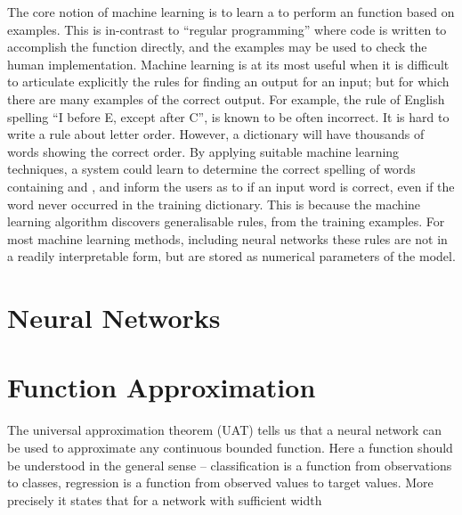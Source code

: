 \documentclass[12pt,parskip]{komatufte}
\begin{document}
The core notion of machine learning is to learn a to perform an function based on examples.
This is in-contrast to ``regular programming'' where code is written to accomplish the function directly, and the examples may be used to check the human implementation.
Machine learning is at its most useful when it is difficult to articulate explicitly the rules for finding an output for an input; but for which there are many examples of the correct output.
For example, the rule of English spelling ``I before E, except after C'', is known to be often incorrect.
It is hard to write a rule about letter order.
However, a dictionary will have thousands of words showing the correct order.
By applying suitable machine learning techniques,
a system could learn to determine the correct spelling of words containing  and ,
and inform the users as to if an input word is correct, even if the word never occurred in the training dictionary.
This is because the machine learning algorithm discovers generalisable rules,
from the training examples.
For most machine learning methods, including neural networks these rules are not in a readily interpretable form, but are stored as numerical parameters of the model.

\section{Neural Networks}



\section{Function Approximation}


The universal approximation theorem (UAT) tells us that a neural network can be used to approximate any continuous bounded function.
Here a function should be understood in the general sense -- classification is a function from observations to classes, regression is a function from observed values to target values.
More precisely it states that for a network with sufficient width
\end{document}
